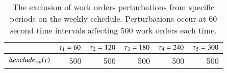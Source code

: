 \begin{table}[H]
	\centering
	\begin{tabular}{lrrrrr}
	\toprule
	                                & $\tau_1 = 60$ & $\tau_2 = 120$ & $\tau_3 = 180$ & $\tau_4 = 240$ & $\tau_5 = 300$ \\ \midrule
	$\Delta exclude_{wp}(\tau)$ & 500                   & 500                    & 500                    & 500                    & 500                    \\ \bottomrule
	\end{tabular}
	\caption{The exclusion of work orders perturbations from specific periods on the weekly schedule. 
		Perturbations occur at 60 second time intervals affecting 500 work orders each time.
	}\label{tab:responses:exclusion}
\end{table}
